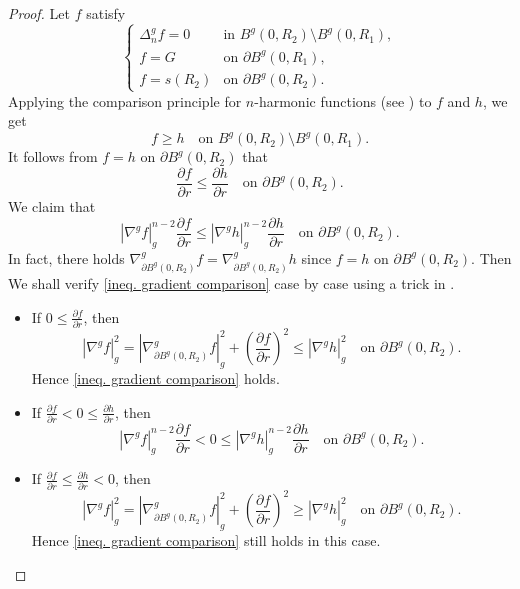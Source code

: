 \documentclass[12pt]{amsart}
\theoremstyle{plain}
\theoremstyle{definition}
\theoremstyle{remark}     %
\numberwithin{equation}{section}
\newcommand{\nablag}{\nabla^g} %
\begin{document}
\begin{proof}
    Let $f$ satisfy
    \[
        \begin{cases}
            \Delta_n^g f=0 &\text{in } B^g(0,R_2)\setminus B^g(0,R_1),\\
            f=G &\text{on } \partial B^g(0,R_1),\\
            f=s(R_2) &\text{on } \partial B^g(0,R_2).
        \end{cases}
    \]
Applying the comparison principle for $n$-harmonic functions (see \cite[Theorem 2.15]{L}) to $f$ and $h$, we get
    \[
        f\geq h \quad \text{on } B^g(0,R_2)\setminus B^g(0,R_1).
    \]
    It follows from $f=h$ on $\partial B^g(0,R_2)$ that 
    \[
        \frac{\partial f}{\partial r} \leq \frac{\partial h}{\partial r} \quad \text{on } \partial B^g(0,R_2).
    \]
    We claim that
    \begin{equation}\label{ineq. gradient comparison}
        |\nablag f|_g^{n-2}\frac{\partial f}{\partial r}
        \leq  
        |\nablag h|_g^{n-2}\frac{\partial h}{\partial r} 
        \quad \text{on } \partial B^g(0,R_2).
    \end{equation}
    In fact, there holds $\nabla_{\partial B^g(0,R_2)}^g f=\nabla_{\partial B^g(0,R_2)}^g h$ since $f=h$ on $\partial B^g(0,R_2)$. Then We shall verify \cref{ineq. gradient comparison} case by case using a trick in \cite[Theorem 5.2]{MQ}.
    \begin{itemize}
        \item If $0\leq \frac{\partial f}{\partial r}$, then 
        \[
            |\nablag f|_g^2=|\nabla_{\partial B^g(0,R_2)}^g f|_g^2+(\frac{\partial f}{\partial r})^2
            \leq |\nablag h|_g^2
             \quad \text{on } \partial B^g(0,R_2).
        \]
        Hence \cref{ineq. gradient comparison} holds.
        \item If $\frac{\partial f}{\partial r}<0\leq \frac{\partial h}{\partial r}$, then
        \[
            |\nablag f|_g^{n-2}\frac{\partial f}{\partial r}<0\leq |\nablag h|_g^{n-2}\frac{\partial h}{\partial r}
             \quad \text{on } \partial B^g(0,R_2).
        \]
        \item If $\frac{\partial f}{\partial r}\leq \frac{\partial h}{\partial r}<0$, then
        \[
            |\nablag f|_g^2=|\nabla_{\partial B^g(0,R_2)}^g f|_g^2+(\frac{\partial f}{\partial r})^2
            \geq |\nablag h|_g^2
             \quad \text{on } \partial B^g(0,R_2).
        \]
        Hence \cref{ineq. gradient comparison} still holds in this case.
    \end{itemize}


\end{proof}
\end{document}
